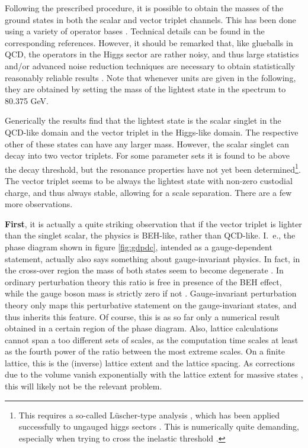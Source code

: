\documentclass[final,twoside,12pt]{article}
\newcommand*{\1}{1\!\!\!\bot}
\begin{document}
Following the prescribed procedure, it is possible to obtain the masses of the ground states in both the scalar and vector triplet channels. This has been done using a variety of operator bases \cite{Wurtz:2013ova,Maas:2013aia,Maas:2014pba,Maas:2012tj,Langguth:1985eu,Langguth:1985dr,Evertz:1986vp,Evertz:1985fc}. Technical details can be found in the corresponding references. However, it should be remarked that, like glueballs in QCD, the operators in the Higgs sector are rather noisy, and thus large statistics and/or advanced noise reduction techniques are necessary to obtain statistically reasonably reliable results \cite{Philipsen:1996af,Wurtz:2013ova,Maas:2014pba}. Note that whenever units are given in the following, they are obtained by setting the mass of the lightest state in the spectrum to 80.375 GeV.

Generically the results \cite{Wurtz:2013ova,Maas:2013aia,Maas:2014pba,Maas:2012tj,Langguth:1985eu,Langguth:1985dr,Evertz:1986vp,Evertz:1985fc,Maas:unpublished} find that the lightest state is the scalar singlet in the QCD-like domain and the vector triplet in the Higgs-like domain. The respective other of these states can have any larger mass. However, the scalar singlet can decay into two vector triplets. For some parameter sets it is found to be above the decay threshold, but the resonance properties have not yet been determined\footnote{This requires a so-called L\"uscher-type analysis \cite{Gattringer:2010zz,Luscher:1990ux,Luscher:1991cf}, which has been applied successfully to ungauged higgs sectors \cite{Zimmermann:1991xx,Gerhold:2011mx}. This is numerically quite demanding, especially when trying to cross the inelastic threshold \cite{Briceno:2014oea,Briceno:2017tce}.}. The vector triplet seems to be always the lightest state with non-zero custodial charge, and thus always stable, allowing for a scale separation. There are a few more observations.

{\bf First}, it is actually a quite striking observation \cite{Langguth:1985eu,Langguth:1985dr,Evertz:1986vp,Evertz:1985fc,Maas:2014pba} that if the vector triplet is lighter than the singlet scalar, the physics is BEH-like, rather than QCD-like. I.\ e., the phase diagram shown in figure \ref{fig:gdpdc}, intended as a gauge-dependent statement, actually also says something about gauge-invariant physics. In fact, in the cross-over region the mass of both states seem to become degenerate \cite{Maas:2014pba}. In ordinary perturbation theory this ratio is free in presence of the BEH effect, while the gauge boson mass is strictly zero if not \cite{Bohm:2001yx}. Gauge-invariant perturbation theory only maps this perturbative statement on the gauge-invariant states, and thus inherits this feature. Of course, this is as so far only a numerical result obtained in a certain region of the phase diagram. Also, lattice calculations cannot span a too different sets of scales, as the computation time scales at least as the fourth power of the ratio between the most extreme scales. On a finite lattice, this is the (inverse) lattice extent and the lattice spacing. As corrections due to the volume vanish exponentially with the lattice extent for massive states \cite{Luscher:1985dn}, this will likely not be the relevant problem.
\end{document}
